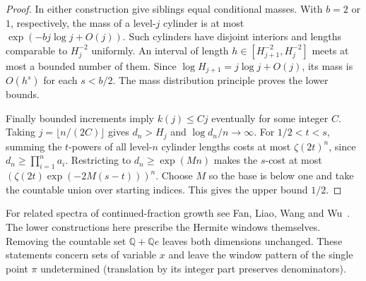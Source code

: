 \documentclass[11pt]{article}
\theoremstyle{definition}
\theoremstyle{remark}
\newcommand{\Q}{\mathbb{Q}}
\begin{document}
\begin{proof}
In either construction give siblings equal conditional masses.
With $b=2$ or $1$, respectively, the mass of a level-$j$ cylinder
is at most $\exp(-bj\log j+O(j))$. Such cylinders have disjoint
interiors and lengths comparable to $H_j^{-2}$ uniformly. An interval
of length $h\in[H_{j+1}^{-2},H_j^{-2}]$ meets at most a bounded number
of them. Since $\log H_{j+1}=j\log j+O(j)$, its mass is $O(h^s)$
for each $s<b/2$. The mass distribution principle proves the lower bounds.

Finally bounded increments imply $k(j)\le Cj$ eventually for some
integer $C$. Taking $j=\lfloor n/(2C)\rfloor$ gives $d_n>H_j$ and
$\log d_n/n\to\infty$. For $1/2<t<s$, summing the $t$-powers of
all level-$n$ cylinder lengths costs at most $\zeta(2t)^n$, since
$d_n\ge\prod_{i=1}^n a_i$. Restricting to $d_n\ge\exp(Mn)$ makes
the $s$-cost at most $(\zeta(2t)\exp(-2M(s-t)))^n$. Choose $M$
so the base is below one and take the countable union over starting
indices. This gives the upper bound $1/2$.
\end{proof}
For related spectra of continued-fraction growth see Fan, Liao, Wang
and Wu~\cite{FLLW}. The lower constructions here prescribe the
Hermite windows themselves. Removing the countable set $\Q+\Q e$
leaves both dimensions unchanged. These statements concern sets of
variable $x$ and leave the window pattern of the single point $\pi$
undetermined (translation by its integer part preserves denominators).
\end{document}
